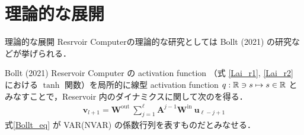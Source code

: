 \section{理論的な展開}

\begin{frame}{理論的な展開}
    Resrvoir Computerの理論的な研究としては Bollt (2021) の研究などが挙げられる．
    \begin{block}{Bollt (2021)}
        Reservoir Computer の activation function （式 \eqref{Lai_r1}, \eqref{Lai_r2} における $\tanh$ 関数）を局所的に線型 activation function $q:\mathbb{R} \ni s \mapsto s \in \mathbb{R}$ とみなすことで，Reservoir 内のダイナミクスに関して次のを得る． \vspace{-.5cm}
        \begin{align}
            \mathbf{v}_{l+1} = \mathbf{W}^{\text {out }} \sum_{j=1}^{\ell} \mathbf{A}^{j-1} \mathbf{W}^{\text {in }} \mathbf{u}_{\ell-j+1} \label{Bollt_eq}
        \end{align}
        式\eqref{Bollt_eq} が VAR(NVAR) の係数行列を表すものだとみなせる．
    \end{block}

\end{frame}
